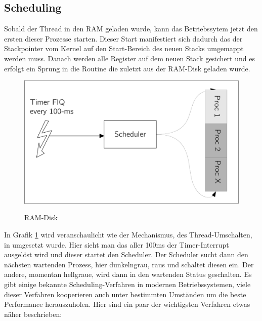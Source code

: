 \subsection{Scheduling}
Sobald der Thread in den RAM geladen wurde, kann das Betriebssytem jetzt den ersten dieser Prozesse starten. Dieser Start manifestiert sich dadurch das der Stackpointer vom Kernel auf den Start-Bereich des neuen Stacks umgemappt werden muss. Danach werden alle Register auf dem neuen Stack gesichert und es erfolgt ein Sprung in die Routine die zuletzt aus der RAM-Disk geladen wurde. 
\begin{figure}[H]
	\begin{center}	
	\caption{RAM-Disk}
	\includegraphics[scale=0.60]{common/scheduler.pdf}
	\label{scheduler}
	\end{center}
\end{figure}
\noindent
In Grafik \ref{scheduler} wird veranschaulicht wie der Mechanismus, des Thread-Umschalten, in \mops umgesetzt wurde. Hier sieht man das aller 100ms der Timer-Interrupt ausgel\"ost wird und dieser startet den Scheduler. Der Scheduler sucht dann den n\"achsten wartenden Prozess, hier dunkelngrau, raus und schaltet diesen ein. Der andere, momentan hellgraue, wird dann in den wartenden Status geschalten.
Es gibt einige bekannte Scheduling-Verfahren in modernen Betriebssystemen, viele dieser Verfahren kooperieren auch unter bestimmten Umst\"anden um die beste Performance herauszuholen. Hier sind ein paar der wichtigsten Verfahren etwas n\"aher beschrieben:
